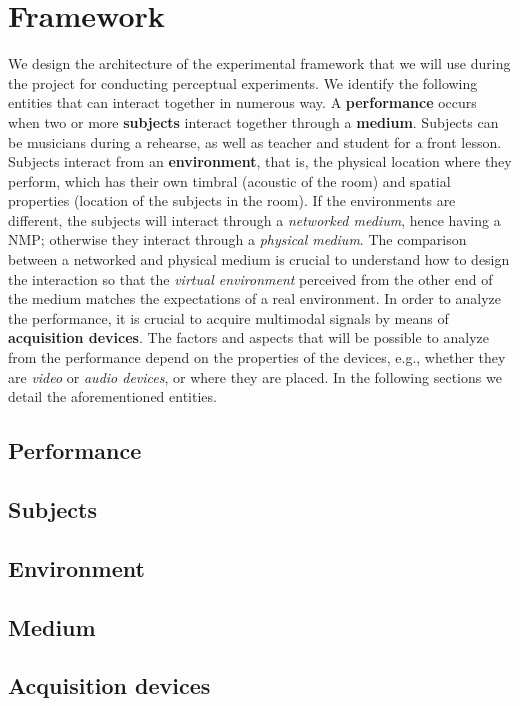 \section{Framework}
We design the architecture of the experimental framework that we will use during the project for conducting perceptual experiments. We identify the following entities that can interact together in numerous way. A \textbf{performance} occurs when two or more \textbf{subjects} interact together through a \textbf{medium}. Subjects can be musicians during a rehearse, as well as teacher and student for a front lesson. Subjects interact from an \textbf{environment}, that is, the physical location where they perform, which has their own timbral (acoustic of the room) and spatial properties (location of the subjects in the room). If the environments are different, the subjects will interact through a \textit{networked medium}, hence having a NMP; otherwise they interact through a \textit{physical medium}. The comparison between a networked and physical medium is crucial to understand how to design the interaction so that the \textit{virtual environment} perceived from the other end of the medium matches the expectations of a real environment. In order to analyze the performance, it is crucial to acquire multimodal signals by means of  \textbf{acquisition devices}. The factors and aspects that will be possible to analyze from the performance depend on the properties of the devices, e.g., whether they are \textit{video} or \textit{audio devices}, or where they are placed. In the following sections we detail the aforementioned entities.


\subsection{Performance}
\subsection{Subjects}
\subsection{Environment}
\subsection{Medium}
\subsection{Acquisition devices}

